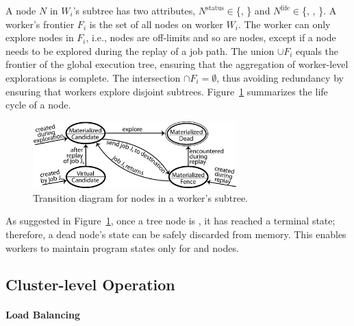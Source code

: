\newcommand{\status}{\ensuremath{\mathrm{status}}\xspace}
\newcommand{\alive}{\ensuremath{\mathrm{life}}\xspace}

A node $N$ in $W_i$'s subtree has two attributes, $N^{\status} \in$\{\materialized, \virtual\!\} and $N^{\alive} \in$\{\candidate, \fence, \dead\!\}.  A worker's frontier $F_i$ is the set of all \candidate nodes on worker $W_i$.  The worker can only explore nodes in $F_i$, i.e., \dead nodes are off-limits and so are \fence nodes, except if a \fence node needs to be explored during the replay of a job path.  The union $\cup F_i$ equals the frontier of the global execution tree, ensuring that the aggregation of worker-level explorations is complete.  The intersection $\cap F_i = \emptyset$, thus avoiding redundancy by ensuring that workers explore disjoint subtrees.  Figure~\ref{fig:transitions} summarizes the life cycle of a node.

\begin{figure}
  \centering
  \includegraphics[width=0.7\textwidth]{paas/figures/node-transitions}
  \caption{Transition diagram for nodes in a worker's subtree.}
 \label{fig:transitions}
\end{figure}

As suggested in Figure~\ref{fig:transitions}, once a tree node is \dead, it has reached a terminal state; therefore, a dead node's state can be safely discarded from memory.  This enables workers to maintain program states only for \candidate and \fence nodes.


\subsection{Cluster-level Operation}
\label{sec:loadBalancing}

\paragraph{Load Balancing}


